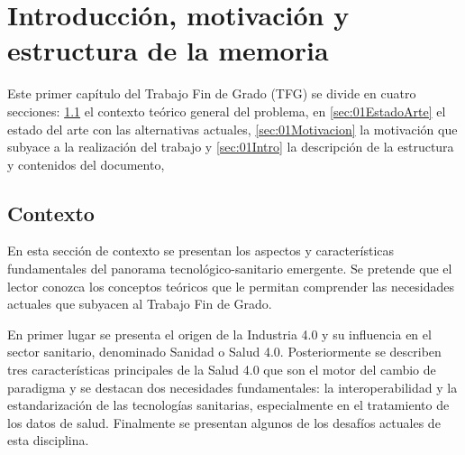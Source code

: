 \chapter{Introducción, motivación y estructura de la memoria}\label{cap:introduccion}

Este primer capítulo del Trabajo Fin de Grado (TFG) se divide en cuatro secciones: \ref{sec:01Contexto} el contexto teórico general del problema, en \ref{sec:01EstadoArte} el estado del arte con las alternativas actuales, \ref{sec:01Motivacion} la motivación que subyace a la realización del trabajo y \ref{sec:01Intro} la descripción de la estructura y contenidos del documento,

\section{Contexto} \label{sec:01Contexto} 

En esta sección de contexto se presentan los aspectos y características fundamentales del panorama tecnológico-sanitario emergente. Se pretende que el lector conozca los conceptos teóricos que le permitan comprender las necesidades actuales que subyacen al Trabajo Fin de Grado.
 

En primer lugar se presenta el origen de la Industria 4.0 y su influencia en el sector sanitario, denominado Sanidad o Salud 4.0. 
Posteriormente se describen tres características principales de la Salud 4.0 que son el motor del cambio de paradigma y se destacan dos necesidades fundamentales: la interoperabilidad y la estandarización de las tecnologías sanitarias, especialmente en el tratamiento de los datos de salud. Finalmente se presentan algunos de los desafíos actuales de esta disciplina.


